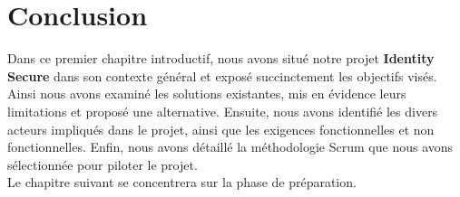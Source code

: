 \section{Conclusion}

Dans ce premier chapitre introductif, nous avons situé notre projet \textbf{Identity Secure} dans son contexte général et exposé succinctement les objectifs visés. Ainsi nous avons examiné les solutions existantes, mis en évidence leurs limitations et proposé une alternative. Ensuite, nous avons identifié les divers acteurs impliqués dans le projet, ainsi que les exigences fonctionnelles et non fonctionnelles. Enfin, nous avons détaillé la méthodologie Scrum que nous avons sélectionnée pour piloter le projet.\\
Le chapitre suivant se concentrera sur la phase de préparation.